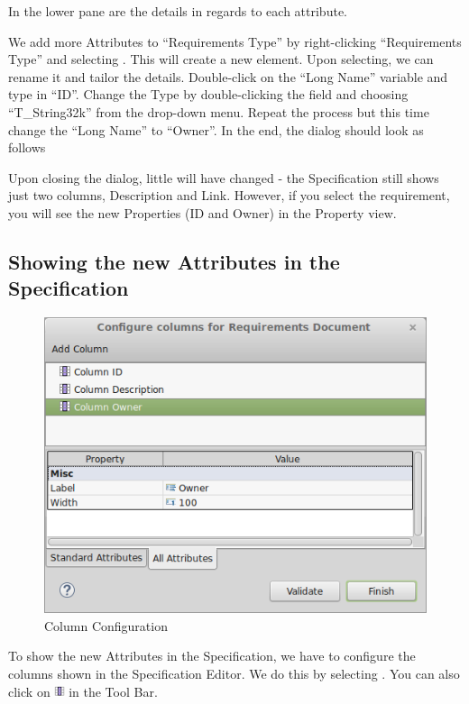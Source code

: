 In the lower pane are the details in regards to each attribute.

We add more Attributes to ``Requirements Type'' by right-clicking ``Requirements Type'' and selecting .  This will create a new element.  Upon selecting, we can rename it and tailor the details.  Double-click on the ``Long Name'' variable and type in ``ID''.  Change the Type by double-clicking the field and choosing ``T\_String32k'' from the drop-down menu.  Repeat the process but this time change the ``Long Name'' to ``Owner''.  In the end, the dialog should look as follows

Upon closing the dialog, little will have changed - the Specification still shows just two columns, Description and Link.  However, if you select the requirement, you will see the new Properties (ID and Owner) in the Property view.

\subsection{Showing the new Attributes in the Specification}

\begin{figure}
\centering      
\includegraphics[width=0.8\linewidth]{../rmf-images/columnconfig.png}      
\caption{Column Configuration}
\label{fig:column_configuration}
\end{figure}

To show the new Attributes in the Specification, we have to configure the columns shown in the Specification Editor.  We do this by selecting .  You can also click on \includegraphics[height=0.8em]{../rmf-images/icons/full/obj16/Column.png} in the Tool Bar.

